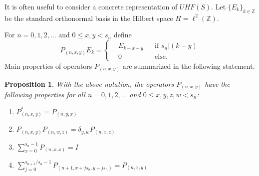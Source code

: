 \documentclass[12pt,reqno]{amsart}
\numberwithin{equation}{section}
\newcommand{\Z}{{\mathbb Z}}
\newtheorem{prop}[theo]{{\sc \bf Proposition}}
\begin{document}
It is often useful to consider a concrete representation of $UHF(S)$. Let $\{E_k\}_{k\in\Z}$ be the standard orthonormal basis in the Hilbert space $H=\ell^2(\Z)$.

For $n=0,1,2, \ldots$ and $0\leq x,y<s_n$ define
\begin{equation*}
P_{(n,x,y)}E_k = \left\{
\begin{aligned}
&E_{k+x-y} &&\textrm{if }s_n|(k-y)  \\
&0 &&\textrm{else.}
\end{aligned}\right.
\end{equation*}
Main properties of operators $P_{(n,x,y)}$ are summarized in the following statement.
\begin{prop}\label{pnxyprop}
With the above notation, the operators $P_{(n,x,y)}$ have the following properties for all  $n=0,1,2, \ldots$ and $0\leq x,y,z,w<s_n$:
\begin{enumerate}
\item $P_{(n,x,y)}^*=P_{(n,y,x)}$
\item  $P_{(n,x,y)}P_{(n,w,z)}=\delta_{y,w}P_{(n,x,z)}$
\item  $\sum\limits_{x=0}^{s_n-1}P_{(n,x,x)}=I$
\item   $\sum\limits_{j=0}^{s_{n+1}/s_n-1}P_{(n+1,x+js_n,y+js_n)}=P_{(n,x,y)}$
\end{enumerate}
\end{prop}
\end{document}
